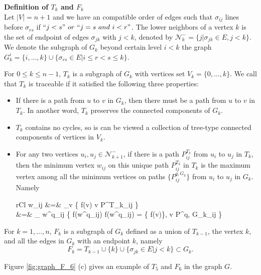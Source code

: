 \documentclass[a4paper,12pt]{article}
\numberwithin{equation}{section}
\DeclareMathOperator*{\argmin}{arg\,min}
\DeclareMathOperator*{\argmax}{arg\,max}
\begin{document}
	
	\noindent \textbf{Definition of $T_k$ and $F_{k}$}\\
	
	Let $\vert V \vert = n+1$ and we have an compatible order of edges such that $\sigma_{ij}$ lines before $\sigma_{rs}$ if $``j<s" \  or \  ``j=s \ and \ i<r"$.	The lower neighbors of a vertex $k$ is the set of endpoint of edges $\sigma_{jk}$ with $j<k$, denoted by $\mathcal{N}^{-}_{k} = \{j \vert \sigma_{jk} \in E, j<k \}$. We denote the subgraph of $G_k$ beyond certain level $i<k$ the graph $G_k^i = \{i,\ldots,k\} \cup \{ \sigma_{rs} \in E \vert i \leq r < s \leq k \}$. 
	
	For $0\leq k \leq n-1$, $T_k$ is a subgraph of $G_k$ with vertices set $V_k = \{0,\ldots, k\}$.	We call that $T_k$ is traceable if it satisfied the following three properties:
	\begin{itemize}
	 \item If there is a path from $u$ to $v$ in $G_k$, then there must be a path from $u$ to $v$ in $T_k$. In another word, $T_k$ preserves the connected components of $G_k$.
	 
	 \item $T_k$ contains no cycles, so is can be viewed a collection of tree-type connected components of vertices in $V_k$.
	 
	 \item For any two vertices $u_i,u_j \in \mathcal{N}^{-}_{k+1}$, if there is a path $P^{T_k}_{ij}$ from $u_i$ to $u_j$ in $T_k$, then the minimum vertex $w_{ij}$ on this unique path $P^{T_k}_{ij}$ in $T_k$ is the maximum vertex among all the minimum vertices on paths $\{P^{q,G_k}_{ij}\}$ from $u_i$ to $u_j$ in $G_k$.	 Namely
	  \begin{IEEEeqnarray*}{rCl}
	    w_{ij} &=& \argmin_{v} \{ f(v) \vert v \in P^{T_k}_{ij} \} \\
	    &=& \argmax_{ w^q_{ij} } \{ f(w^q_{ij}) \vert f(w^q_{ij}) = \min \{ f(v)\}, \forall v \in P^{q, G_k}_{ij} \}
	  \end{IEEEeqnarray*}
	\end{itemize}
	
	For $k = 1,\ldots, n$, $F_{k}$ is a subgraph of $G_{k}$ defined as a union of $T_{k-1}$, the vertex ${k}$, and all the edges in $G_{k}$ with an endpoint $k$, namely
	$$ F_{k} = T_{k-1} \cup \{k\} \cup \{ \sigma_{jk} \in E \vert j<k \} \subset G_{k}.$$	

	Figure \ref{fig:graph_F_6} (c) gives an example of $T_5$ and $F_6$ in the graph $G$.\\
	
\end{document}
